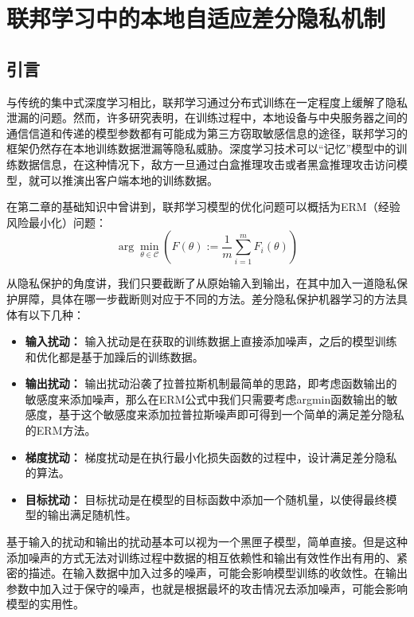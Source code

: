 \chapter{联邦学习中的本地自适应差分隐私机制}

\label{ch3}

\section{引言}
与传统的集中式深度学习相比，联邦学习通过分布式训练在一定程度上缓解了隐私泄漏的问题。然而，许多研究表明，在训练过程中，本地设备与中央服务器之间的通信信道和传递的模型参数都有可能成为第三方窃取敏感信息的途径，联邦学习的框架仍然存在本地训练数据泄漏等隐私威胁。深度学习技术可以“记忆”模型中的训练数据信息，在这种情况下，敌方一旦通过白盒推理攻击或者黑盒推理攻击访问模型，就可以推演出客户端本地的训练数据。

在第二章的基础知识中曾讲到，联邦学习模型的优化问题可以概括为ERM（经验风险最小化）问题：
\begin{equation}\label{eq:ERM}
\arg \min _{\theta \in \mathcal{C}}\left(F(\theta):=\frac{1}{m} \sum_{i=1}^{m} F_{i}(\theta)\right)
\end{equation}

从隐私保护的角度讲，我们只要截断了从原始输入到输出，在其中加入一道隐私保护屏障，具体在哪一步截断则对应于不同的方法。差分隐私保护机器学习的方法具体有以下几种：
\begin{itemize}
	\item \textbf{输入扰动：} 输入扰动是在获取的训练数据上直接添加噪声，之后的模型训练和优化都是基于加躁后的训练数据。
	\item \textbf{输出扰动：} 输出扰动沿袭了拉普拉斯机制最简单的思路，即考虑函数输出的敏感度来添加噪声，那么在ERM公式中我们只需要考虑argmin函数输出的敏感度，基于这个敏感度来添加拉普拉斯噪声即可得到一个简单的满足差分隐私的ERM方法。
	\item \textbf{梯度扰动：} 梯度扰动是在执行最小化损失函数的过程中，设计满足差分隐私的算法。
	\item \textbf{目标扰动：} 目标扰动是在模型的目标函数中添加一个随机量，以使得最终模型的输出满足随机性。
\end{itemize}

基于输入的扰动和输出的扰动基本可以视为一个黑匣子模型，简单直接。但是这种添加噪声的方式无法对训练过程中数据的相互依赖性和输出有效性作出有用的、紧密的描述。在输入数据中加入过多的噪声，可能会影响模型训练的收敛性。在输出参数中加入过于保守的噪声，也就是根据最坏的攻击情况去添加噪声，可能会影响模型的实用性。

